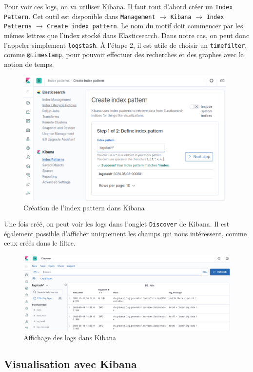 \documentclass[paper=a4, fontsize=11pt]{scrartcl}
\begin{document}
Pour voir ces logs, on va utiliser Kibana. Il faut tout d'abord créer un \verb,Index Pattern,. Cet outil est disponible dans \verb,Management, $\rightarrow$ \verb,Kibana, $\rightarrow$ \verb,Index Patterns, $\rightarrow$ \verb,Create index pattern,. Le nom du motif doit commencer par les mêmes lettres que l'index stocké dans Elasticsearch. Dans notre cas, on peut donc l'appeler simplement \verb,logstash,. 
À l'étape 2, il est utile de choisir un \verb,timefilter,, comme \verb,@timestamp,, pour pouvoir effectuer des recherches et des graphes avec la notion de temps.
\begin{figure}[H]
    \centering
    \includegraphics[width=11cm]{img/screenshots/kib_create_index_pattern.png}
    \caption{Création de l'index pattern dans Kibana}
    \label{f-kibCreateIndexPattern}
\end{figure}
Une fois créé, on peut voir les logs dans l'onglet \verb,Discover, de Kibana. Il est également possible d'afficher uniquement les champs qui nous intéressent, comme ceux créés dans le filtre.
\begin{figure}[H]
    \centering
    \includegraphics[width=18cm]{img/screenshots/kib_logs_arrived.png}
    \caption{Affichage des logs dans Kibana}
    \label{f-kibLogsArrived}
\end{figure}

\subsection{Visualisation avec Kibana} \label{ss-visualisationAvecKibana}
\end{document}
